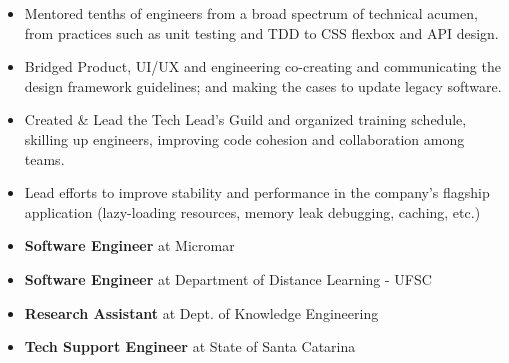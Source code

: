 \documentclass[10pt,a4paper]{altacv}
\begin{document}
\begin{itemize}
\item Mentored tenths of engineers from a broad spectrum of technical acumen, from practices such as unit testing and TDD to CSS flexbox and API design.
\item Bridged Product, UI/UX and engineering co-creating and communicating the design framework guidelines; and making the cases to update legacy software.
\item Created \& Lead the Tech Lead's Guild and organized training schedule, skilling up engineers, improving code cohesion and collaboration among teams.
\item Lead efforts to improve stability and performance in the company's flagship application (lazy-loading resources, memory leak debugging, caching, etc.)
\end{itemize}
\divider

\begin{itemize}
\item \textbf{Software Engineer} at Micromar
\item \textbf{Software Engineer} at Department of Distance Learning - UFSC
\item \textbf{Research Assistant} at Dept. of Knowledge Engineering
\item \textbf{Tech Support Engineer} at State of Santa Catarina
\end{itemize}

\clearpage
\end{document}
